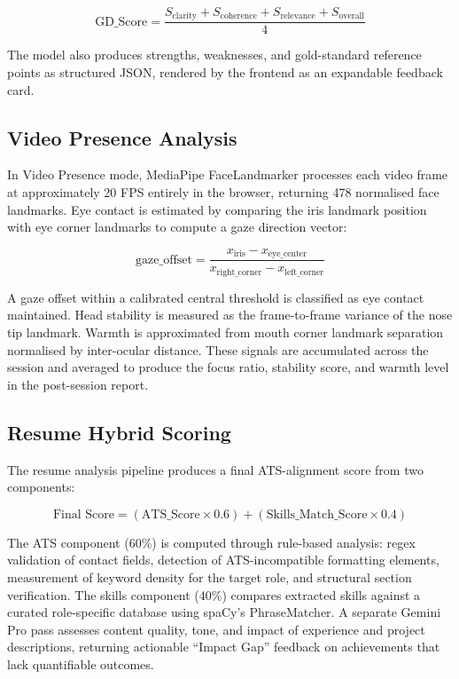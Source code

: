 \documentclass[12pt,a4paper]{report}
\begin{document}
\begin{equation}
    \text{GD\_Score} = \frac{S_{\text{clarity}} + S_{\text{coherence}} + S_{\text{relevance}} + S_{\text{overall}}}{4}
\end{equation}

The model also produces strengths, weaknesses, and gold-standard reference points as structured JSON, rendered by the frontend as an expandable feedback card.

\subsection{Video Presence Analysis}

In Video Presence mode, MediaPipe FaceLandmarker processes each video frame at approximately 20 FPS entirely in the browser, returning 478 normalised face landmarks. Eye contact is estimated by comparing the iris landmark position with eye corner landmarks to compute a gaze direction vector:

\begin{equation}
    \text{gaze\_offset} = \frac{x_{\text{iris}} - x_{\text{eye\_center}}}{x_{\text{right\_corner}} - x_{\text{left\_corner}}}
\end{equation}

A gaze offset within a calibrated central threshold is classified as eye contact maintained. Head stability is measured as the frame-to-frame variance of the nose tip landmark. Warmth is approximated from mouth corner landmark separation normalised by inter-ocular distance. These signals are accumulated across the session and averaged to produce the focus ratio, stability score, and warmth level in the post-session report.

\subsection{Resume Hybrid Scoring}

The resume analysis pipeline produces a final ATS-alignment score from two components:

\begin{equation}
    \text{Final Score} = (\text{ATS\_Score} \times 0.6) + (\text{Skills\_Match\_Score} \times 0.4)
\end{equation}

The ATS component (60\%) is computed through rule-based analysis: regex validation of contact fields, detection of ATS-incompatible formatting elements, measurement of keyword density for the target role, and structural section verification. The skills component (40\%) compares extracted skills against a curated role-specific database using spaCy's PhraseMatcher. A separate Gemini Pro pass assesses content quality, tone, and impact of experience and project descriptions, returning actionable ``Impact Gap'' feedback on achievements that lack quantifiable outcomes.
\end{document}
